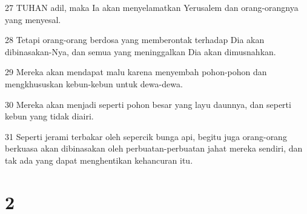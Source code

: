 \par 27 TUHAN adil, maka Ia akan menyelamatkan Yerusalem dan orang-orangnya yang menyesal.
\par 28 Tetapi orang-orang berdosa yang memberontak terhadap Dia akan dibinasakan-Nya, dan semua yang meninggalkan Dia akan dimusnahkan.
\par 29 Mereka akan mendapat malu karena menyembah pohon-pohon dan mengkhususkan kebun-kebun untuk dewa-dewa.
\par 30 Mereka akan menjadi seperti pohon besar yang layu daunnya, dan seperti kebun yang tidak diairi.
\par 31 Seperti jerami terbakar oleh sepercik bunga api, begitu juga orang-orang berkuasa akan dibinasakan oleh perbuatan-perbuatan jahat mereka sendiri, dan tak ada yang dapat menghentikan kehancuran itu.

\chapter{2}


